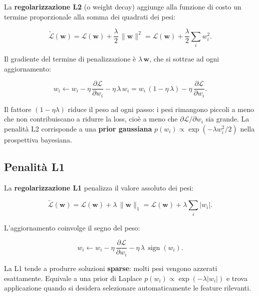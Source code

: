 La \textbf{regolarizzazione L2} (o weight decay) aggiunge alla funzione di
costo un termine proporzionale alla somma dei quadrati dei pesi:

\begin{equation}
  \widetilde{\mathcal{L}}(\mathbf{w}) = \mathcal{L}(\mathbf{w})
    + \frac{\lambda}{2}\,\|\mathbf{w}\|^2
  = \mathcal{L}(\mathbf{w}) + \frac{\lambda}{2}\sum_i w_i^2.
  \label{eq:l2-loss}
\end{equation}

Il gradiente del termine di penalizzazione è $\lambda\,\mathbf{w}$, che si
sottrae ad ogni aggiornamento:

\begin{equation}
  w_i \leftarrow w_i - \eta\,\frac{\partial \mathcal{L}}{\partial w_i}
              - \eta\,\lambda\, w_i
  = w_i\,(1 - \eta\,\lambda) - \eta\,\frac{\partial\mathcal{L}}{\partial w_i}.
  \label{eq:l2-update}
\end{equation}

Il fattore $(1-\eta\lambda)$ riduce il peso ad ogni passo: i pesi rimangono
piccoli a meno che non contribuiscano a ridurre la loss, cioè a meno che
$\partial\mathcal{L}/\partial w_i$ sia grande. La penalità L2 corrisponde a
una \textbf{prior gaussiana} $p(w_i) \propto \exp(-\lambda w_i^2 / 2)$ nella
prospettiva bayesiana.

\subsection{Penalità L1}
\label{subsec:l1-penalty}

La \textbf{regolarizzazione L1} penalizza il valore assoluto dei pesi:

\begin{equation}
  \widetilde{\mathcal{L}}(\mathbf{w}) = \mathcal{L}(\mathbf{w})
    + \lambda\,\|\mathbf{w}\|_1
  = \mathcal{L}(\mathbf{w}) + \lambda\sum_i |w_i|.
  \label{eq:l1-loss}
\end{equation}

L'aggiornamento coinvolge il segno del peso:

\begin{equation}
  w_i \leftarrow w_i - \eta\,\frac{\partial\mathcal{L}}{\partial w_i}
              - \eta\,\lambda\,\operatorname{sign}(w_i).
  \label{eq:l1-update}
\end{equation}

La L1 tende a produrre soluzioni \textbf{sparse}: molti pesi vengono azzerati
esattamente. Equivale a una prior di Laplace $p(w_i) \propto
\exp(-\lambda|w_i|)$ e trova applicazione quando si desidera selezionare
automaticamente le feature rilevanti.

